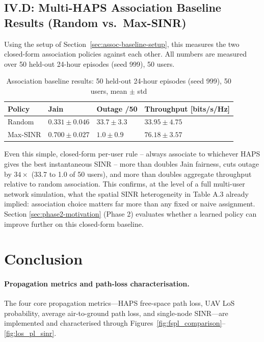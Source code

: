 \documentclass[conference]{IEEEtran}
\begin{document}
\subsection{IV.D: Multi-HAPS Association Baseline Results (Random vs.\ Max-SINR)}
\label{sec:assoc-baseline-results}

Using the setup of Section~\ref{sec:assoc-baseline-setup}, this measures the two
closed-form association policies against each other. All numbers are measured over
50 held-out 24-hour episodes (seed 999), 50 users.

\begin{table}[t]
\centering
\caption{Association baseline results: 50 held-out 24-hour episodes (seed 999), 50 users, mean $\pm$ std}
\label{tab:assoc-baseline-results}
{\scriptsize\setlength{\tabcolsep}{3pt}
\begin{tabularx}{\columnwidth}{|>{\raggedright\arraybackslash}X|>{\centering\arraybackslash}X|>{\centering\arraybackslash}X|>{\centering\arraybackslash}X|}
\hline
\textbf{Policy} & \textbf{Jain} & \textbf{Outage /50} & \textbf{Throughput [bits/s/Hz]}\\
\hline
Random & $0.331\pm0.046$ & $33.7\pm3.3$ & $33.95\pm4.75$ \\
\hline
Max-SINR & $\mathbf{0.700\pm0.027}$ & $\mathbf{1.0\pm0.9}$ & $\mathbf{76.18\pm3.57}$ \\
\hline
\end{tabularx}}
\end{table}

Even this simple, closed-form per-user rule -- always associate to whichever HAPS
gives the best instantaneous SINR -- more than doubles Jain fairness, cuts outage by
$34\times$ (33.7 to 1.0 of 50 users), and more than doubles aggregate throughput
relative to random association. This confirms, at the level of a full multi-user
network simulation, what the spatial SINR heterogeneity in Table A.3 already implied:
association choice matters far more than any fixed or naive assignment. Section
\ref{sec:phase2-motivation} (Phase 2) evaluates whether a learned policy can improve
further on this closed-form baseline.

\section{Conclusion}

\paragraph{Propagation metrics and path-loss characterisation.}
The four core propagation metrics---HAPS free-space path loss, UAV LoS probability,
average air-to-ground path loss, and single-node SINR---are implemented and
characterised through Figures~\ref{fig:fspl_comparison}--\ref{fig:los_pl_sinr}.
\end{document}
